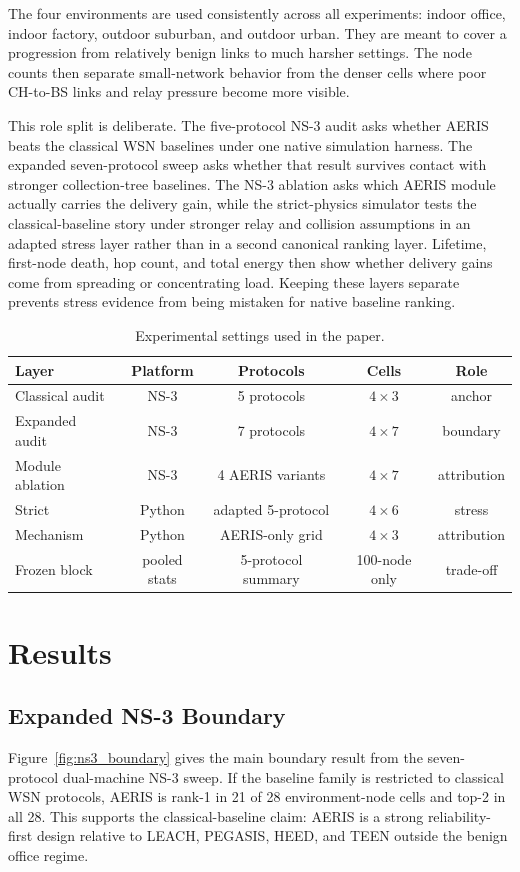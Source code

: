 \documentclass[conference]{IEEEtran}
\begin{document}
The four environments are used consistently across all experiments: indoor office, indoor factory, outdoor suburban, and outdoor urban. They are meant to cover a progression from relatively benign links to much harsher settings. The node counts then separate small-network behavior from the denser cells where poor CH-to-BS links and relay pressure become more visible.

This role split is deliberate. The five-protocol NS-3 audit asks whether AERIS beats the classical WSN baselines under one native simulation harness. The expanded seven-protocol sweep asks whether that result survives contact with stronger collection-tree baselines. The NS-3 ablation asks which AERIS module actually carries the delivery gain, while the strict-physics simulator tests the classical-baseline story under stronger relay and collision assumptions in an adapted stress layer rather than in a second canonical ranking layer. Lifetime, first-node death, hop count, and total energy then show whether delivery gains come from spreading or concentrating load. Keeping these layers separate prevents stress evidence from being mistaken for native baseline ranking.

\begin{table}[t]
\caption{Experimental settings used in the paper.}
\label{tbl:exp_settings}
\centering
\scriptsize
\setlength{\tabcolsep}{3pt}
\begin{tabular}{lcccc}
\toprule
Layer & Platform & Protocols & Cells & Role \\
\midrule
Classical audit & NS-3 & 5 protocols & $4 \times 3$ & anchor \\
Expanded audit & NS-3 & 7 protocols & $4 \times 7$ & boundary \\
Module ablation & NS-3 & 4 AERIS variants & $4 \times 7$ & attribution \\
Strict & Python & adapted 5-protocol & $4 \times 6$ & stress \\
Mechanism & Python & AERIS-only grid & $4 \times 3$ & attribution \\
Frozen block & pooled stats & 5-protocol summary & 100-node only & trade-off \\
\bottomrule
\end{tabular}
\end{table}
\section{Results}
\subsection{Expanded NS-3 Boundary}
Figure~\ref{fig:ns3_boundary} gives the main boundary result from the seven-protocol dual-machine NS-3 sweep. If the baseline family is restricted to classical WSN protocols, AERIS is rank-1 in 21 of 28 environment-node cells and top-2 in all 28. This supports the classical-baseline claim: AERIS is a strong reliability-first design relative to LEACH, PEGASIS, HEED, and TEEN outside the benign office regime.
\end{document}
